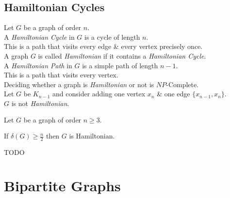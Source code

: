 \documentclass[11pt,a4paper]{article}
\begin{document}
\subsection{Hamiltonian Cycles}

Let $G$ be a graph of order $n$.\\
A \textit{Hamiltonian Cycle} in $G$ is a cycle of length $n$.\\
\nb This is a path that visits every edge \& every vertex precisely once.\\

A graph $G$ is called \textit{Hamiltonian} if it contains a \textit{Hamiltonian Cycle}.\\

A \textit{Hamiltonian Path} in $G$ is a simple path of length $n-1$.\\
\nb This is a path that visits every vertex.\\

Deciding whether a graph is \textit{Hamiltonian} or not is $NP$-Complete.\\

Let $G$ be $K_{n-1}$ and consider adding one vertex $x_n$ \& one edge $\{x_{n-1},x_n\}$.\\
$G$ is not \textit{Hamiltonian}.\\

Let $G$ be a graph of order $n\geq 3$.
\begin{center}
If $\delta(G)\geq\frac{n}{2}$ then $G$ is Hamiltonian.
\end{center}

TODO

\section{Bipartite Graphs}
\end{document}
